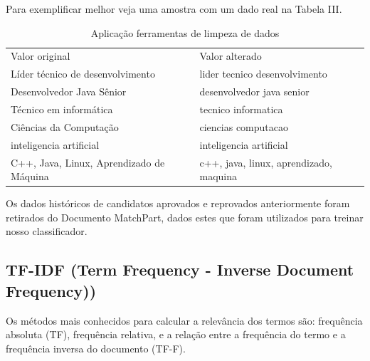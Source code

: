 \documentclass[conference]{IEEEtran}
\begin{document}
    Para exemplificar melhor veja uma amostra com um dado real na Tabela III.

\begin{table}[h]
 \centering
 {\renewcommand\arraystretch{1.25}
\caption{Aplicação ferramentas de limpeza de dados}
 \begin{tabular}{ l l }
  \cline{1-1}\cline{2-2}  
    \multicolumn{1}{|p{3.5cm}|}{\cellcolor{}Valor original \centering } &
    \multicolumn{1}{p{3.5cm}|}{\cellcolor{}Valor alterado \centering }
  \\  
  \cline{1-1}\cline{2-2}  
    \multicolumn{1}{|p{3.0cm}|}{Líder técnico de desenvolvimento } &
    \multicolumn{1}{p{4.217cm}|}{ lider tecnico desenvolvimento}
  \\  
  \cline{1-1}\cline{2-2}  
    \multicolumn{1}{|p{3.0cm}|}{  Desenvolvedor Java Sênior } &
    \multicolumn{1}{p{4.217cm}|}{ desenvolvedor java senior}
  \\  
  \cline{1-1}\cline{2-2}  
    \multicolumn{1}{|p{3.0cm}|}{ Técnico em informática } &
    \multicolumn{1}{p{4.217cm}|}{ tecnico informatica}
  \\  
  \cline{1-1}\cline{2-2}  
    \multicolumn{1}{|p{3.0cm}|}{  Ciências da Computação} &
    \multicolumn{1}{p{4.217cm}|}{ ciencias computacao }
  \\  
  \cline{1-1}\cline{2-2}  
    \multicolumn{1}{|p{3.0cm}|}{  inteligencia artificial} &
    \multicolumn{1}{p{4.217cm}|}{ inteligencia artificial}
  \\  
  \cline{1-1}\cline{2-2}  
    \multicolumn{1}{|p{3.0cm}|}{  C++, Java, Linux, Aprendizado de Máquina  } &
    \multicolumn{1}{p{4.217cm}|}{ c++, java, linux, aprendizado, maquina }
  \\  
  \hline
 \end{tabular} }
\end{table}


Os dados históricos de candidatos aprovados e reprovados anteriormente foram retirados do Documento MatchPart, dados estes que foram utilizados para treinar nosso classificador. 


	\subsection{TF-IDF (Term Frequency - Inverse Document Frequency))}

    Os métodos mais conhecidos para calcular a relevância dos termos são: frequência  absoluta (TF), frequência relativa, e a relação entre a frequência do termo e a frequência inversa do documento (TF-F).
    
\end{document}

